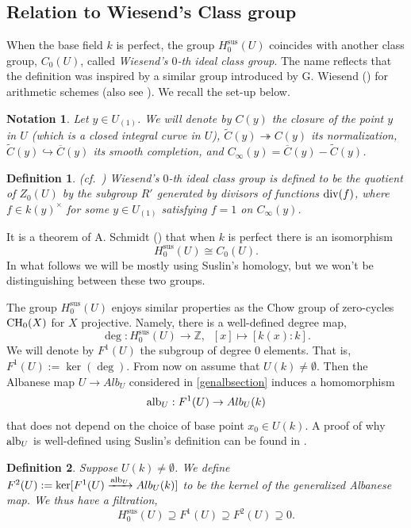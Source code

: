 \documentclass[12pt]{amsart}
\newtheorem{defn}[defn]{Definition}
\newtheorem{notn}[notn]{Notation}
\theoremstyle{remark}
\newcommand{\Z}{{\mathbb Z}}
\renewcommand{\1}{{\mathbb{S}}}
\newcommand{\alb}{{\rm alb}}
\newcommand{\CH}{{\rm CH}}
\newcommand{\<}{\langle}
\renewcommand{\>}{\rangle}
\newcommand{\Sus}{{\operatorname{sus}}}
\newcommand{\dv}{{\rm div}}
\begin{document}
\subsection*{Relation to Wiesend's Class group}
When the base field $k$ is perfect, the group $H_0^\Sus(U)$ coincides with another class group, $C_0(U)$, called \textit{Wiesend's $0$-th ideal class group}. The name reflects that the definition was inspired by a similar group introduced by G. Wiesend (\cite{Wie}) for arithmetic schemes (also see \cite{Yam1}). 
We recall the set-up below. 
\begin{notn}
    Let $y\in U_{(1)}$. We will denote by $C(y)$ the closure of the point $y$ in $U$ (which is a closed integral curve in $U$), $\widetilde{C}(y)\twoheadrightarrow C(y)$ its normalization, $\widetilde{C}(y)\hookrightarrow\overline{C}(y)$ its smooth completion, and $C_\infty(y)=\overline{C}(y)-\widetilde{C}(y)$. 
\end{notn}

\begin{defn} (cf.~\cite[Definition 1.1]{Yam1})
Wiesend's $0$-th ideal class group is defined to be the quotient of $Z_0(U)$ by the subgroup $R'$ generated by divisors of functions $\dv(f)$, where $f\in k(y)^\times$ for some $y\in U_{(1)}$ satisfying $f=1$ on $C_\infty(y)$. 
\end{defn} 

It is a theorem of A. Schmidt (\cite[Theorem 5.1]{Sch}) that when $k$ is perfect there is an isomorphism 
\[H_0^\Sus(U)\cong C_0(U).\] In what follows we will be mostly using Suslin's homology, but we won't be distinguishing between these two groups. 

The group $H_0^\Sus(U)$ enjoys similar properties as the Chow group of zero-cycles $\CH_0(X)$ for $X$ projective. Namely, there is a well-defined degree map,
\[\deg:H_0^\Sus(U)\to\Z,\;\; [x]\mapsto [k(x):k].\] 
We will denote by $F^1(U)$ the subgroup of degree $0$ elements. That is, $F^1(U):=\ker(\deg)$. 
From now on assume that $U(k)\neq\emptyset$. Then the Albanese map $U\to Alb_U$ considered in \autoref{genalbsection} induces a homomorphism
$$\alb_U: F^1(U)\to Alb_U(k)$$  
that does not depend on the choice of base point $x_0\in U(k)$. 
A proof of why $\alb_U$ is well-defined using Suslin's definition can be found in \cite[Section 3]{SpSz}. 

\begin{defn} Suppose $U(k)\neq\emptyset$. 
    We define $F^2(U):=\ker[F^1(U)\xrightarrow{\alb_U}Alb_U(k)]$ to be the kernel of the generalized Albanese map. We thus have a filtration,
    \[H_0^\Sus(U)\supseteq F^1(U)\supseteq F^2(U)\supseteq 0.\] 
\end{defn}
\end{document}
